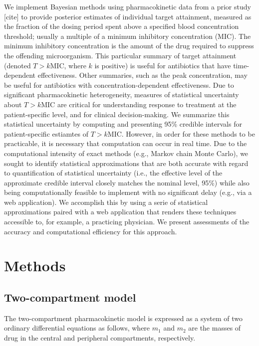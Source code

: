 \documentclass{article}\usepackage[]{graphicx}\usepackage[]{color}
\begin{document}
We implement Bayesian methods using pharmacokinetic data from a prior study [cite] to provide posterior estimates of individual target attainment, measured as the fraction of the dosing period spent above a specified blood concentration threshold; usually a multiple of a minimum inhibitory concentration (MIC). The minimum inhibitory concentration is the amount of the drug required to suppress the offending microorganism. This particular summary of target attainment (denoted $T>k$MIC, where $k$ is positive) is useful for antibiotics that have time-dependent effectiveness. Other summaries, such as the peak concentration, may be useful for antibiotics with concentration-dependent effectiveness. Due to significant pharmacokinetic heterogeneity, measures of statistical uncertainty about $T>k$MIC are critical for understanding response to treatment at the patient-specific level, and for clinical decision-making. We summarize this statistical uncertainty by computing and presenting 95\% credible intervals for patient-specific estiamtes of $T>k$MIC. However, in order for these methods to be practicable, it is necessary that computation can occur in real time. Due to the computational intensity of exact methods (e.g., Markov chain Monte Carlo), we sought to identify statistical approximations that are both accurate with regard to quantification of statistical uncertainty (i.e., the effective level of the approximate credible interval closely matches the nominal level, 95\%) while also being computationally feasible to implement with no significant delay (e.g., via a web application). We accomplish this by using a serie of statistical approximations paired with a web application that renders these techniques accessible to, for example, a practicing physician. We present assessments of the accuracy and computational efficiency for this approach.





\section{Methods}
\subsection{Two-compartment model}
The two-compartment pharmacokinetic model is expressed as a system of two ordinary differential equations as follows, where $m_1$ and $m_2$ are the masses of drug in the central and peripheral compartments, respectively.
\end{document}
